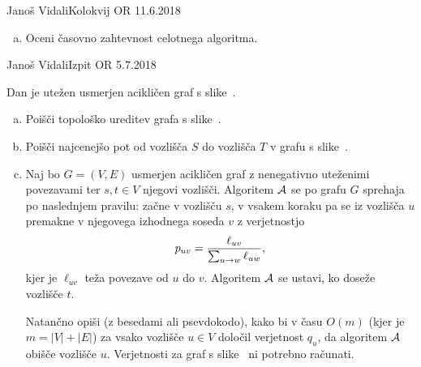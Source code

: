 \begin{naloga}{Janoš Vidali}{Kolokvij OR 11.6.2018}
\begin{vprasanje}[prerezna]
\begin{enumerate}[(a)]
\item Oceni časovno zahtevnost celotnega algoritma.
\end{enumerate}

\begin{slika}
\pgfslika
{}
\end{slika}
\end{vprasanje}
\begin{odgovor}
\end{odgovor}
\end{naloga}


\begin{naloga}{Janoš Vidali}{Izpit OR 5.7.2018}
\begin{vprasanje}[dag]
Dan je utežen usmerjen acikličen graf s slike~\fig{}.

\begin{enumerate}[(a)]
\item Poišči topološko ureditev grafa s slike~\fig{}.

\item Poišči najcenejšo pot od vozlišča $S$ do vozlišča $T$
v grafu s slike~\fig{}.

\item Naj bo $G = (V, E)$ usmerjen acikličen graf
z nenegativno uteženimi povezavami
ter $s, t \in V$ njegovi vozlišči.
Algoritem $\mathcal{A}$ se po grafu $G$ sprehaja po naslednjem pravilu:
začne v vozlišču $s$,
v vsakem koraku pa se iz vozlišča $u$ premakne
v njegovega izhodnega soseda $v$ z verjetnostjo
$$
p_{uv} = {\ell_{uv} \over \sum_{u \to w} \ell_{uw}} ,
$$
kjer je $\ell_{uv}$ teža povezave od $u$ do $v$.
Algoritem $\mathcal{A}$ se ustavi, ko doseže vozlišče $t$.

Natančno opiši (z besedami ali psevdokodo),
kako bi v času $O(m)$ (kjer je $m = |V| + |E|$)
za vsako vozlišče $u \in V$ določil verjetnost $q_u$,
da algoritem $\mathcal{A}$ obišče vozlišče $u$.
Verjetnosti za graf s slike~\fig{} ni potrebno računati.
\end{enumerate}

\begin{slika}
\pgfslika
{}
\end{slika}
\end{vprasanje}
\begin{odgovor}
\end{odgovor}
\end{naloga}


